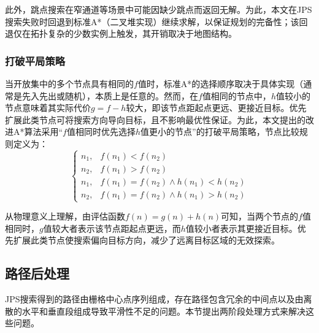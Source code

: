 \documentclass[lettersize,journal]{IEEEtran}
\begin{document}
此外，跳点搜索在窄通道等场景中可能因缺少跳点而返回无解。为此，本文在JPS搜索失败时回退到标准A*（二叉堆实现）继续求解，以保证规划的完备性；该回退仅在拓扑复杂的少数实例上触发，其开销取决于地图结构。

\subsubsection{打破平局策略}
当开放集中的多个节点具有相同的$f$值时，标准A*的选择顺序取决于具体实现（通常是先入先出或随机），本质上是任意的。然而，在$f$值相同的节点中，$h$值较小的节点意味着其实际代价$g = f - h$较大，即该节点距起点更远、更接近目标。优先扩展此类节点可将搜索方向导向目标，且不影响最优性保证。为此，本文提出的改进A*算法采用``$f$值相同时优先选择$h$值更小的节点''的打破平局策略，节点比较规则定义为：
\begin{equation}
\begin{cases}
n_1, & f(n_1) < f(n_2) \\
n_2, & f(n_1) > f(n_2) \\
n_1, & f(n_1) = f(n_2) \land h(n_1) < h(n_2) \\
n_2, & f(n_1) = f(n_2) \land h(n_1) > h(n_2)
\end{cases}
\label{eq:tbreak}
\end{equation}

从物理意义上理解，由评估函数$f(n) = g(n) + h(n)$可知，当两个节点的$f$值相同时，$g$值较大者表示该节点距起点更远，而$h$值较小者表示其更接近目标。优先扩展此类节点使搜索偏向目标方向，减少了远离目标区域的无效探索。
\subsection{路径后处理}
\label{subsec:post}
JPS搜索得到的路径由栅格中心点序列组成，存在路径包含冗余的中间点以及由离散的水平和垂直段组成导致平滑性不足的问题。本节提出两阶段处理方式来解决这些问题。
\end{document}
